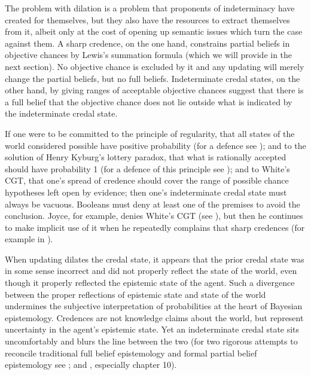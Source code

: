 The problem with dilation is a problem that proponents
of indeterminacy have created for themselves, but they
also have the resources to extract themselves from it,
albeit only at the cost of opening up semantic issues
which turn the case against them. A sharp credence, on
the one hand, constrains partial beliefs in objective
chances by Lewis's summation formula (which we will
provide in the next section). No objective chance is
excluded by it and any updating will merely change the
partial beliefs, but no full beliefs. Indeterminate
credal states, on the other hand, by giving ranges of
acceptable objective chances suggest that there is a
full belief that the objective chance does not lie
outside what is indicated by the indeterminate credal
state.

If one were to be committed to the principle of
regularity, that all states of the world considered
possible have positive probability (for a defence see
); and to the solution of
Henry Kyburg's lottery paradox, that what is rationally
accepted should have probability 1 (for a defence of
this principle see );
and to White's CGT, that one's spread of credence
should cover the range of possible chance hypotheses
left open by evidence; then one's indeterminate credal
state must always be vacuous. Booleans must deny at
least one of the premises to avoid the conclusion.
Joyce, for example, denies White's CGT (see
), but then he continues to make
implicit use of it when he repeatedly complains that
sharp credences  (for example in ).

When updating dilates the credal state, it appears that
the prior credal state was in some sense incorrect and
did not properly reflect the state of the world, even
though it properly reflected the epistemic state of the
agent. Such a divergence between the proper reflections
of epistemic state and state of the world undermines
the subjective interpretation of probabilities at the
heart of Bayesian epistemology. Credences are not
knowledge claims about the world, but represent
uncertainty in the agent's epistemic state. Yet an
indeterminate credal state sits uncomfortably and blurs
the line between the two (for two rigorous attempts to
reconcile traditional full belief epistemology and
formal partial belief epistemology see
; and ,
especially chapter 10).

